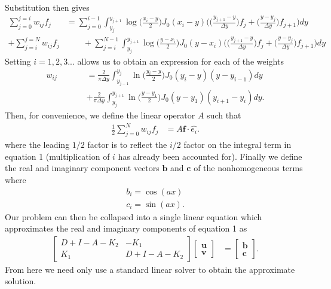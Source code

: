 \documentclass[10pt]{article}
\renewcommand{\vec}[1]{\boldsymbol{#1}}
\begin{document}
Substitution then gives
\begin{align}
    \sum_{j=0}^{j=i} w_{ij} f_j &= \sum_{j=0}^{i-1} \int_{y_{j}}^{y_{j+1}} \log \Big( \frac{x_i - y}{2} \Big) J_0(x_i - y) \Big( \Big(\frac{y_{j+1} - y}{\Delta y}\Big)f_j + \Big( \frac{y - y_{j}}{\Delta y} \Big)f_{j+1} \Big) dy \\
    + \sum_{j=i}^{j=N} w_{ij} f_j &\qquad + \sum_{j=i}^{N-1} \int_{y_j}^{y_{j+1}} \log \Big( \frac{y - x_i}{2} \Big) J_0(y - x_i) \Big( \Big(\frac{y_{j+1} - y}{\Delta y}\Big)f_j + \Big( \frac{y - y_{j}}{\Delta y} \Big)f_{j+1} \Big) dy
\end{align}
Setting $i=1,2,3...$ allows us to obtain an expression for each of the weights
\begin{align}
    w_{ij} &= \frac{2}{\pi \Delta y} \int_{y_{j-1}}^{y_j} \ln \Big( \frac{y_i - y}{2} \Big) J_0(y_i - y) (y - y_{i-1})dy \\
    \qquad \qquad &+ \frac{2}{\pi \Delta y} \int_{y_{j}}^{y_{j+1}} \ln \Big( \frac{y - y_1}{2} \Big) J_0(y - y_1) (y_{i+1} - y_i)dy.
\end{align}
Then, for convenience, we define the linear operator $A$ such that
\begin{align}
    \frac{1}{2}\sum_{j=0}^N w_{ij} f_j &= A \vec{f} \cdot \hat{e_i}.
\end{align}
where the leading $1/2$ factor is to reflect the $i/2$ factor on the integral term in equation 1 (multiplication of $i$ has already been accounted for).
Finally we define the real and imaginary component vectors $\vec{b}$ and $\vec{c}$ of the nonhomogeneous terms where
\begin{align}
    b_i = \cos(ax) \\
    c_i = \sin(ax).
\end{align}
Our problem can then be collapsed into a single linear equation which approximates the real and imaginary components of equation 1 as
\begin{align}
    \begin{bmatrix}
        D + I - A - K_2 & -K_1 \\
        K_1 & D + I - A - K_2
    \end{bmatrix}
    \begin{bmatrix}
        \vec{u} \\ \vec{v}
    \end{bmatrix}
    &= \begin{bmatrix} \vec{b} \\ \vec{c} \end{bmatrix}.
\end{align}
From here we need only use a standard linear solver to obtain the approximate solution.
\clearpage
\end{document}
